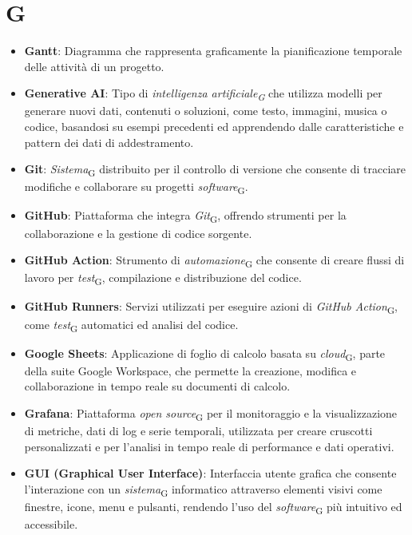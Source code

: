 \section{G}
\begin{itemize}
    \item \textbf{Gantt}: Diagramma che rappresenta graficamente la pianificazione temporale delle attività di un progetto.
    \item \textbf{Generative AI}: Tipo di \textit{intelligenza artificiale\textsubscript{G}} che utilizza modelli per generare nuovi dati, contenuti o soluzioni, come testo, immagini, musica o codice, basandosi su esempi precedenti ed apprendendo dalle caratteristiche e pattern dei dati di addestramento.
    \item \textbf{Git}: \textit{Sistema}\textsubscript{G} distribuito per il controllo di versione che consente di tracciare modifiche e collaborare su progetti \textit{software}\textsubscript{G}.
    \item \textbf{GitHub}: Piattaforma che integra \textit{Git}\textsubscript{G}, offrendo strumenti per la collaborazione e la gestione di codice sorgente.
    \item \textbf{GitHub Action}: Strumento di \textit{automazione}\textsubscript{G} che consente di creare flussi di lavoro per \textit{test}\textsubscript{G}, compilazione e distribuzione del codice.
    \item \textbf{GitHub Runners}: Servizi utilizzati per eseguire azioni di \textit{GitHub Action}\textsubscript{G}, come \textit{test}\textsubscript{G} automatici ed analisi del codice.
    \item \textbf{Google Sheets}: Applicazione di foglio di calcolo basata su \textit{cloud}\textsubscript{G}, parte della suite Google Workspace, che permette la creazione, modifica e collaborazione in tempo reale su documenti di calcolo.
    \item \textbf{Grafana}: Piattaforma \textit{open source}\textsubscript{G} per il monitoraggio e la visualizzazione di metriche, dati di log e serie temporali, utilizzata per creare cruscotti personalizzati e per l'analisi in tempo reale di performance e dati operativi.
    \item \textbf{GUI (Graphical User Interface)}: Interfaccia utente grafica che consente l'interazione con un \textit{sistema}\textsubscript{G} informatico attraverso elementi visivi come finestre, icone, menu e pulsanti, rendendo l'uso del \textit{software}\textsubscript{G} più intuitivo ed accessibile.

\end{itemize}
